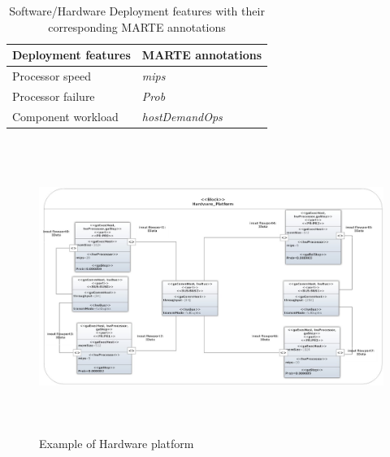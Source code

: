 \documentclass[3p,times,procedia,authoryear,round]{elsarticle}
\begin{document}


\begin{table}[!ht]
    \begin{center}
        
        \begin{tabular}{ l l }
            
            \hline
            Deployment features  &  MARTE annotations  \\ 
            \hline
            Processor speed &      \emph{mips}\\	
            Processor failure &      \emph{Prob}\\	
            Component workload & \emph{hostDemandOps}\\		
            
            
            \hline			
            
        \end{tabular}
        \normalsize
    \end{center}
    \caption{Software/Hardware Deployment features with their corresponding MARTE annotations}
    \label{table1Marte}
\end{table}



\begin{figure}[!ht]
    \centering
    \includegraphics[width=380pt, height =270pt]{platform.jpg}
    \caption{Example of Hardware platform}
    \label{hardplatform}
\end{figure}
\end{document}
